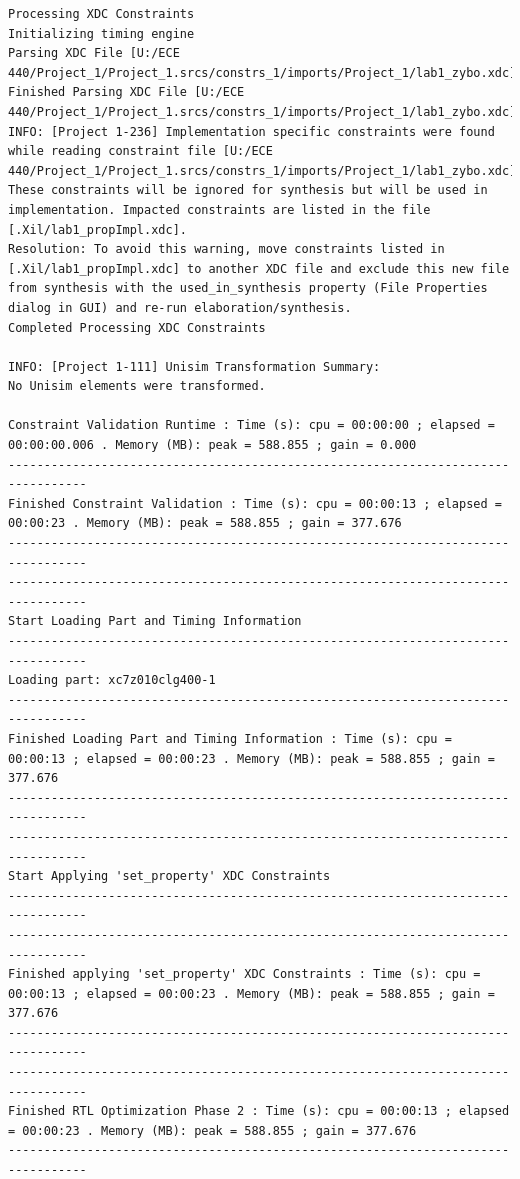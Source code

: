 \documentclass[a4paper, 12pt]{article}
\begin{document}
\begin{verbatim}
Processing XDC Constraints
Initializing timing engine
Parsing XDC File [U:/ECE 440/Project_1/Project_1.srcs/constrs_1/imports/Project_1/lab1_zybo.xdc]
Finished Parsing XDC File [U:/ECE 440/Project_1/Project_1.srcs/constrs_1/imports/Project_1/lab1_zybo.xdc]
INFO: [Project 1-236] Implementation specific constraints were found while reading constraint file [U:/ECE 440/Project_1/Project_1.srcs/constrs_1/imports/Project_1/lab1_zybo.xdc]. These constraints will be ignored for synthesis but will be used in implementation. Impacted constraints are listed in the file [.Xil/lab1_propImpl.xdc].
Resolution: To avoid this warning, move constraints listed in [.Xil/lab1_propImpl.xdc] to another XDC file and exclude this new file from synthesis with the used_in_synthesis property (File Properties dialog in GUI) and re-run elaboration/synthesis.
Completed Processing XDC Constraints

INFO: [Project 1-111] Unisim Transformation Summary:
No Unisim elements were transformed.

Constraint Validation Runtime : Time (s): cpu = 00:00:00 ; elapsed = 00:00:00.006 . Memory (MB): peak = 588.855 ; gain = 0.000
---------------------------------------------------------------------------------
Finished Constraint Validation : Time (s): cpu = 00:00:13 ; elapsed = 00:00:23 . Memory (MB): peak = 588.855 ; gain = 377.676
---------------------------------------------------------------------------------
---------------------------------------------------------------------------------
Start Loading Part and Timing Information
---------------------------------------------------------------------------------
Loading part: xc7z010clg400-1
---------------------------------------------------------------------------------
Finished Loading Part and Timing Information : Time (s): cpu = 00:00:13 ; elapsed = 00:00:23 . Memory (MB): peak = 588.855 ; gain = 377.676
---------------------------------------------------------------------------------
---------------------------------------------------------------------------------
Start Applying 'set_property' XDC Constraints
---------------------------------------------------------------------------------
---------------------------------------------------------------------------------
Finished applying 'set_property' XDC Constraints : Time (s): cpu = 00:00:13 ; elapsed = 00:00:23 . Memory (MB): peak = 588.855 ; gain = 377.676
---------------------------------------------------------------------------------
---------------------------------------------------------------------------------
Finished RTL Optimization Phase 2 : Time (s): cpu = 00:00:13 ; elapsed = 00:00:23 . Memory (MB): peak = 588.855 ; gain = 377.676
---------------------------------------------------------------------------------


\end{verbatim}
\end{document}
